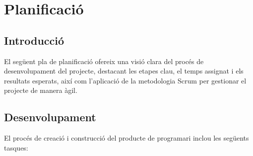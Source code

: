 \documentclass[a4paper,12pt,twoside]{ThesisStyle}
\begin{document}
\chapter{Planificació}
\label{chp:planificació}

\section{Introducció}
\label{sec:Introducció}

El següent pla de planificació ofereix una visió clara del procés de desenvolupament del projecte, destacant les etapes clau, el temps assignat i els resultats esperats, així com l'aplicació de la metodologia Scrum per gestionar el projecte de manera àgil.



\section{Desenvolupament}

El procés de creació i construcció del producte de programari inclou les següents tasques:
\end{document}
